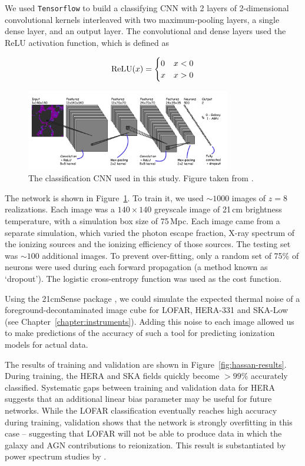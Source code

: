 We used {\tt Tensorflow} \citep{tensorflow} to build a classifying CNN with 2 layers of 2-dimensional convolutional kernels interleaved with two maximum-pooling layers, a single dense layer, and an output layer. The convolutional and dense layers used the ReLU activation function, which is defined as

\begin{equation}
{\rm ReLU}(x) = 
\begin{cases} 
      0 & x < 0 \\
      x & x >0 
\end{cases}
\end{equation}

\begin{figure}
\centering
\includegraphics[width=0.8\textwidth]{chapters/hera_ml/figures/hassan-cnn.png}
\caption{The classification CNN used in this study. Figure taken from \cite{Hassan.18}.}
\label{fig:hassan-cnn}
\end{figure}

The network is shown in Figure~\ref{fig:hassan-cnn}. To train it, we used $\sim 1000$ images of $z=8$ realizations. Each image was a $140\times140$ greyscale image of 21\,cm brightness temperature, with a simulation box size of 75\,Mpc. Each image came from a separate simulation, which varied the photon escape fraction, X-ray spectrum of the ionizing sources and the ionizing efficiency of those sources. The testing set was $\sim 100$ additional images. To prevent over-fitting, only a random set of 75\% of neurons were used during each forward propagation (a method known as `dropout'). The logistic cross-entropy function was used as the cost function.

Using the {\sc 21cmSense} package \citep{Pober.14}, we could simulate the expected thermal noise of a foreground-decontaminated image cube for LOFAR, HERA-331 and SKA-Low (see Chapter~\ref{chapter:instruments}). Adding this noise to each image allowed us to make predictions of the accuracy of such a tool for predicting ionization models for actual data.

The results of training and validation are shown in Figure~\ref{fig:hassan-results}. During training, the HERA and SKA fields quickly become $>99\%$ accurately classified. Systematic gaps between training and validation data for HERA suggests that an additional linear bias parameter may be useful for future networks. While the LOFAR classification eventually reaches high accuracy during training, validation shows that the network is strongly overfitting in this case -- suggesting that LOFAR will not be able to produce data in which the galaxy and AGN contributions to reionization. This result is substantiated by power spectrum studies by \cite{Hassan.17}.

